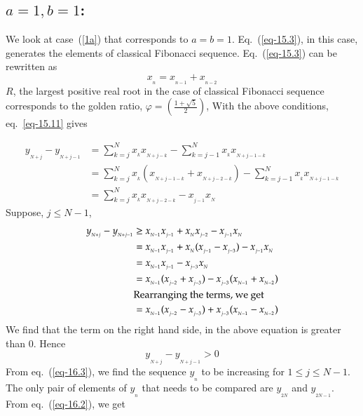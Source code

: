 \begin{multicols}{2}
\section{\underline{$a=1, b =1$}:}\label{section-16}
We look at case~(\ref{1a}) that corresponds to $a = b = 1$. Eq.~(\ref{eq-15.3}), in this case, generates the elements of classical Fibonacci sequence. Eq.~(\ref{eq-15.3}) can be rewritten as
\begin{equation}
x_{_n} = x_{_{n-1}} + x_{_{n-2}}\label{eq-16.1}
\end{equation}
$R$, the largest positive real root in the case of classical Fibonacci sequence corresponds to the golden ratio, $\varphi = \displaystyle{\left(\frac{1+\sqrt5}{2}\right)}$,
With the above conditions, eq.~\ref{eq-15.11} gives

\begin{align}
y_{_{N+j}} - y_{_{N+j-1}} &= \displaystyle{\sum_{k=j}^{N}}x_{_{k}}x_{_{N+j-k}} -  \displaystyle{\sum_{k=j-1}^{N}}x_{_k}x_{_{N+j-1-k}}\label{eq-16.2}\\
&= \displaystyle{\sum_{k=j}^{N}}x_{_{k}}(x_{_{N+j-1-k}}+x_{_{N+j-2-k}}) -  \displaystyle{\sum_{k=j-1}^{N}}x_{_k}x_{_{N+j-1-k}}\nonumber\\
&= \displaystyle{\sum_{k=j}^{N}}x_{_{k}}x_{_{N+j-2-k}} - x_{_{j-1}}x_{_N}\nonumber
\end{align}
Suppose, $j \leq N-1$,
\begin{align*}
y_{_{N+j}} - y_{_{N+j-1}} &\geq x_{_{N-1}}x_{_{j-1}} + x_{_N}x_{_{j-2}} - x_{_{j-1}}x_{_N}\nonumber\\
&= x_{_{N-1}}x_{_{j-1}} + x_{_N}(x_{_{j-1}}-x_{_{j-3}})- x_{_{j-1}}x_{_N}\nonumber\\
&= x_{_{N-1}}x_{_{j-1}} - x_{_{j-3}}x_{_N}\nonumber\\
&= x_{_{N-1}}(x_{_{j-2}}+x_{_{j-3}}) - x_{_{j-3}}(x_{_{N-1}}+x_{_{N-2}})\nonumber\\
&\textup{Rearranging the terms, we get}\nonumber\\
&= x_{_{N-1}}(x_{_{j-2}} - x_{_{j-3}}) + x_{_{j-3}}(x_{_{N-1}} - x_{_{N-2}})\nonumber
\end{align*}
We find that the term on the right hand side, in the above equation is greater than 0. Hence
\begin{equation}
y_{_{N+j}} - y_{_{N+j-1}} > 0\label{eq-16.3}
\end{equation}
From eq.~(\ref{eq-16.3}), we find the sequence $y_{_n}$ to be increasing for $1 \leq j \leq N-1$. The only pair of elements of $y_{_n}$ that needs to be compared are $y_{_{2N}}$ and $y_{_{2N-1}}$. From eq.~(\ref{eq-16.2}), we get

\end{multicols}
